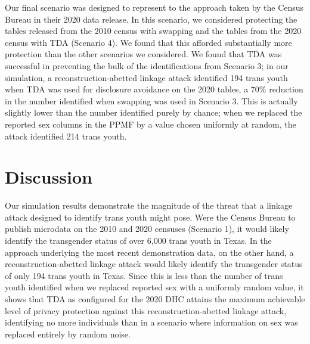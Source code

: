 \documentclass{jpc} %
\theoremstyle{plain}\newtheorem{satz}[thm]{Satz} %
\begin{document}
Our final scenario was designed to represent to the approach taken by the Census Bureau in their 2020 data release. In this scenario, we considered protecting the tables released from the 2010 census with swapping and the tables from the 2020 census with TDA (Scenario 4).  We found that this afforded substantially more protection than the other scenarios we considered.  We found that TDA was successful in preventing the bulk of the identifications from Scenario 3; in our simulation, a reconstruction-abetted linkage attack identified 194 trans youth when TDA was used for disclosure avoidance on the 2020 tables, a 70\% reduction in the number identified when swapping was used in Scenario 3.  This is actually slightly lower than the number identified purely by chance; when we replaced the reported sex columns in the PPMF by a value chosen uniformly at random, the attack identified 214 trans youth.


\section{Discussion}

Our simulation results demonstrate the magnitude of the threat that a linkage attack designed to identify trans youth might pose.  Were the Census Bureau to publish microdata on the 2010 and 2020 censuses (Scenario 1), it would likely identify the transgender status of over 6,000 trans youth in Texas.  In the approach underlying the most recent demonstration data, on the other hand, a reconstruction-abetted linkage attack would likely identify the transgender status of only 194 trans youth in Texas.  Since this is less than the number of trans youth identified when we replaced reported sex with a uniformly random value, it shows that TDA as configured for the 2020 DHC attains the maximum achievable level of privacy protection against this reconstruction-abetted linkage attack, identifying no more individuals than in a scenario where information on sex was replaced entirely by random noise.
\end{document}
